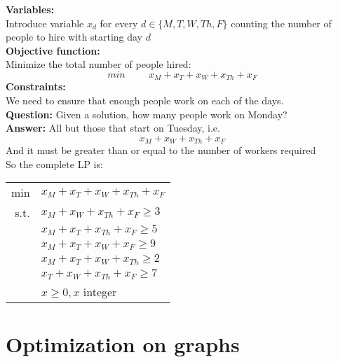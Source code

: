\documentclass[letterpaper, 12pt]{article}
\begin{document}
    \bigskip
    \textbf{Variables:}\\
    Introduce variable $x_d$ for every $d \in \{M,T,W,Th,F\}$ counting the number of people to hire with starting day $d$\\
    \bigskip
    \textbf{Objective function:}\\
    Minimize the total number of people hired:\\
    $$min \hspace{1cm} x_M + x_T + x_W + x_{Th} + x_F$$
    \textbf{Constraints:}\\
    We need to ensure that enough people work on each of the days.\\
    \textbf{Question:} Given a solution, how many people work on Monday?\\
    \textbf{Answer:} All but those that start on Tuesday, i.e.
    $$x_M + x_W + x_{Th} + x_F$$
    And it must be greater than or equal to the number of workers required\\
    So the complete LP is:\\
    \bigskip
    \begin{center}
        \begin{tabular}{rl}
            min & $x_M + x_T + x_W + x_{Th} + x_F$\\
            s.t. & $x_M + x_W + x_{Th} + x_F \geq 3$\\
            & $x_M + x_T + x_{Th} + x_F \geq 5$\\
            & $x_M + x_T + x_W + x_F \geq 9$\\
            & $x_M + x_T + x_W + x_{Th} \geq 2$\\
            &  $x_T + x_W + x_{Th} + x_F \geq 7$\\
            & $x \geq 0, x$ integer\\
        \end{tabular}
    \end{center}
    
    \pagebreak
    \section{Optimization on graphs}
\end{document}
